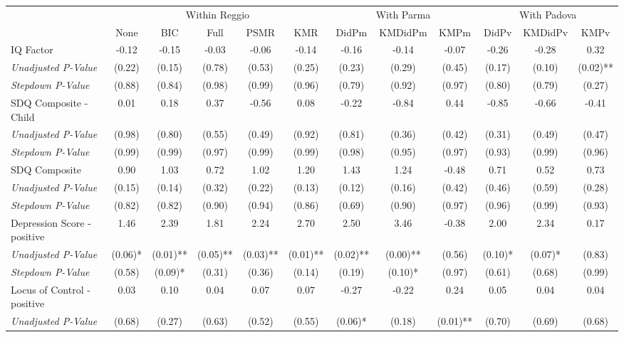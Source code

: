 \begin{tabular}{l c c c c c c c c c c c}
\toprule
& \multicolumn{5}{c}{Within Reggio} & \multicolumn{3}{c}{With Parma} & \multicolumn{3}{c}{With Padova} \\\cmidrule(lr){2-6} \cmidrule(lr){7-9} \cmidrule(lr){10-12}
 & None & BIC & Full & PSMR & KMR & DidPm & KMDidPm & KMPm & DidPv & KMDidPv & KMPv \\
\midrule
IQ Factor & -0.12 & -0.15 & -0.03 & -0.06 & -0.14 & -0.16 & -0.14 & -0.07 & -0.26 & -0.28 & 0.32 \\
\quad \textit{Unadjusted P-Value} & (0.22) & (0.15) & (0.78) & (0.53) & (0.25) & (0.23) & (0.29) & (0.45) & (0.17) & (0.10) & (0.02)** \\
\quad \textit{Stepdown P-Value} & (0.88) & (0.84) & (0.98) & (0.99) & (0.96) & (0.79) & (0.92) & (0.97) & (0.80) & (0.79) & (0.27) \\
SDQ Composite - Child & 0.01 & 0.18 & 0.37 & -0.56 & 0.08 & -0.22 & -0.84 & 0.44 & -0.85 & -0.66 & -0.41 \\
\quad \textit{Unadjusted P-Value} & (0.98) & (0.80) & (0.55) & (0.49) & (0.92) & (0.81) & (0.36) & (0.42) & (0.31) & (0.49) & (0.47) \\
\quad \textit{Stepdown P-Value} & (0.99) & (0.99) & (0.97) & (0.99) & (0.99) & (0.98) & (0.95) & (0.97) & (0.93) & (0.99) & (0.96) \\
SDQ Composite & 0.90 & 1.03 & 0.72 & 1.02 & 1.20 & 1.43 & 1.24 & -0.48 & 0.71 & 0.52 & 0.73 \\
\quad \textit{Unadjusted P-Value} & (0.15) & (0.14) & (0.32) & (0.22) & (0.13) & (0.12) & (0.16) & (0.42) & (0.46) & (0.59) & (0.28) \\
\quad \textit{Stepdown P-Value} & (0.82) & (0.82) & (0.90) & (0.94) & (0.86) & (0.69) & (0.90) & (0.97) & (0.96) & (0.99) & (0.93) \\
Depression Score - positive & 1.46 & 2.39 & 1.81 & 2.24 & 2.70 & 2.50 & 3.46 & -0.38 & 2.00 & 2.34 & 0.17 \\
\quad \textit{Unadjusted P-Value} & (0.06)* & (0.01)** & (0.05)** & (0.03)** & (0.01)** & (0.02)** & (0.00)** & (0.56) & (0.10)* & (0.07)* & (0.83) \\
\quad \textit{Stepdown P-Value} & (0.58) & (0.09)* & (0.31) & (0.36) & (0.14) & (0.19) & (0.10)* & (0.97) & (0.61) & (0.68) & (0.99) \\
Locus of Control - positive & 0.03 & 0.10 & 0.04 & 0.07 & 0.07 & -0.27 & -0.22 & 0.24 & 0.05 & 0.04 & 0.04 \\
\quad \textit{Unadjusted P-Value} & (0.68) & (0.27) & (0.63) & (0.52) & (0.55) & (0.06)* & (0.18) & (0.01)** & (0.70) & (0.69) & (0.68) \\

\end{tabular}
